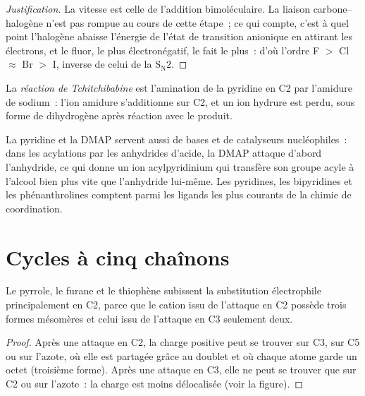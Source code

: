 \begin{proof}[Justification]
La vitesse est celle de l'addition bimoléculaire. La liaison
carbone--halogène n'est pas rompue au cours de cette étape~; ce qui compte,
c'est à quel point l'halogène abaisse l'énergie de l'état de transition
anionique en attirant les électrons, et le fluor, le plus électronégatif,
le fait le plus~: d'où l'ordre F $>$ Cl $\approx$ Br $>$ I, inverse de celui de la $\mathrm S_\mathrm N2$.
\end{proof}

\begin{definition}\label{def:b3:heterocycles:chichibabin}
La \emph{réaction de Tchitchibabine} est l'amination de
la pyridine en C2 par l'amidure de sodium~: l'ion amidure s'additionne sur
C2, et un ion hydrure est perdu, sous forme de dihydrogène après réaction
avec le produit.
\end{definition}

La pyridine et la DMAP servent aussi de bases et de catalyseurs
nucléophiles~: dans les acylations par les anhydrides d'acide, la DMAP
attaque d'abord l'anhydride, ce qui donne un ion acylpyridinium qui
transfère son groupe acyle à l'alcool bien plus vite que l'anhydride
lui-même. Les pyridines, les bipyridines et les phénanthrolines comptent
parmi les ligands les plus courants de la chimie de coordination.

\section{Cycles à cinq chaînons}

\begin{proposition}\label{prop:b3:heterocycles:pyrrole-c2}
Le pyrrole, le furane et le thiophène subissent la substitution
électrophile principalement en C2, parce que le cation issu de l'attaque en
C2 possède trois formes mésomères et celui issu de l'attaque en C3
seulement deux.
\end{proposition}

\begin{proof}
Après une attaque en C2, la charge positive peut se trouver sur C3, sur C5
ou sur l'azote, où elle est partagée grâce au doublet et où chaque atome
garde un octet (troisième forme). Après une attaque en C3, elle ne peut se
trouver que sur C2 ou sur l'azote~: la charge est moins délocalisée (voir la
figure).
\end{proof}

